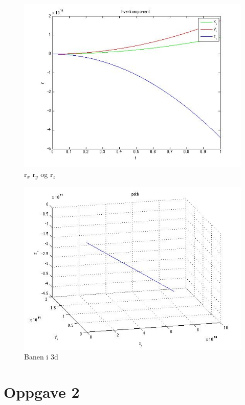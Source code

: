 \documentclass[12pt,a4paper,final,leqno]{report}
\begin{document}
\begin{figure}[H]
\caption{r$_x$ r$_y$ og r$_z$}
\centering
\includegraphics[width=\textwidth]{oppgave1component.jpg}
\end{figure}
\begin{figure}[H]
\caption{Banen i 3d}
\centering
\includegraphics[width=\textwidth]{oppgave1path3d.jpg}
\end{figure}



\newpage
\chapter*{Oppgave 2}
\end{document}
